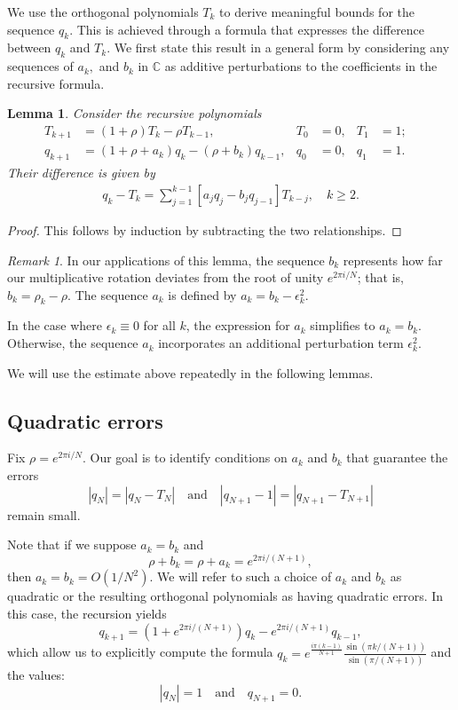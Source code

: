 \documentclass{amsart}
\newtheorem{lemma}{Lemma}
\theoremstyle{remark}
\newtheorem*{remark}{Remark}
\theoremstyle{definition}
\begin{document}
We use the orthogonal polynomials ${T_k}$ to derive meaningful bounds for the sequence ${q_k}$. This is achieved through a formula that expresses the difference between ${q_k}$ and ${T_k}$. We first state this result in a general form by considering any sequences of  $a_k,$ and $b_{k}$ in $\mathbb{C}$ as additive perturbations to the coefficients in the recursive formula.   

	\begin{lemma}\label{lem:relationship}
		Consider the recursive polynomials 
		\begin{align}
			T_{k+1} &= (1+\rho) T_{k}-\rho T_{k-1}, & T_0&=0, & T_1&=1;& \nonumber \\ 
			q_{k+1} &= (1+\rho+a_k) q_{k}-(\rho+b_k) q_{k-1}, & q_0&=0, & q_1&=1.  & \label{eq:qk formula}
		\end{align}
		Their difference is given by 
		\begin{align*}
			q_k-T_k = \sum_{j=1}^{k-1}[a_jq_j-b_jq_{j-1}]T_{k-j}, \quad k\geq 2.
		\end{align*}
	\end{lemma}
    \begin{proof}
    This follows by induction by subtracting the two relationships. 
    \end{proof}

	\begin{remark}
   In our applications of this lemma, the sequence ${b_k}$ represents how far our multiplicative rotation deviates from the root of unity $e^{2\pi i/N}$; that is, $b_k = \rho_k - \rho$. The sequence ${a_k}$ is defined by $a_k = b_k - \epsilon_k^2$.

In the case where $\epsilon_k \equiv 0$ for all $k$, the expression for $a_{k}$ simplifies to $a_k = b_k$. Otherwise, the sequence ${a_k}$ incorporates an additional perturbation term $\epsilon_k^2$.
    \end{remark}

We will use the estimate above repeatedly in the following lemmas.

\subsection{Quadratic errors}

Fix $\rho=e^{2\pi i/N}$. Our goal is to identify conditions on $a_k$ and $b_k$ that guarantee the errors \[|q_N|=|q_N-T_N|\quad\text{and}\quad|q_{N+1}-1|=|q_{N+1}-T_{N+1}|\] remain small. 

Note that if we suppose $a_{k}=b_{k}$ and 
\[
\rho+b_k=\rho+a_k=e^{2 \pi i/(N+1)},
\]
then $a_k=b_k=O(1/N^2)$. We will refer to such a choice of $a_{k}$ and $b_{k}$ as quadratic or the resulting orthogonal polynomials as having quadratic errors.  In this case, the recursion yields
\[
q_{k+1}=(1+e^{2 \pi i/(N+1)})q_k-e^{2 \pi i/(N+1)}q_{k-1},
\]
which allow us to explicitly compute the formula $q_k= e^{\frac{i\pi (k-1)}{N+1}}\frac{\sin(\pi k/(N+1))}{\sin(\pi/(N+1))} $ and the values:
\[|q_N|=1\quad\text{and}\quad q_{N+1}=0.\]
\end{document}
